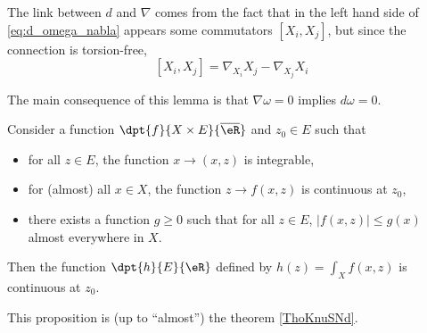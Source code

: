 \begin{remark}
The link between $d$ and $\nabla$ comes from the fact that in the left hand side of \eqref{eq:d_omega_nabla} appears some commutators $[X_i,X_j]$, but since the connection is torsion-free,
\[
  [X_i,X_j]=\nabla_{X_i}X_j-\nabla_{X_j}X_i
\]
\end{remark}
The main consequence of this lemma is that $\nabla\omega=0$ implies $d\omega=0$. 

\begin{proposition} \label{prop:fdefint}
    Consider a function $\dpt{f}{X\times E}{\overline{\eR}}$ and $z_0\in E$ such that
    \begin{itemize}
        \item for all $z\in E$, the function $x\to(x,z)$ is integrable,
        \item for (almost) all $x\in X$, the function $z\to f(x,z)$ is continuous at $z_0$,
        \item there exists a function $g\geq 0$ such that for all $z\in E$, $| f(x,z) |\leq g(x)$ almost everywhere in $X$.
    \end{itemize}
    Then the function $\dpt{h}{E}{\eR}$ defined by $h(z)=\int_Xf(x,z)$ is continuous at $z_0$.
\end{proposition}
This proposition is (up to ``almost'') the theorem \ref{ThoKnuSNd}.


% 
% 
% 
% 
